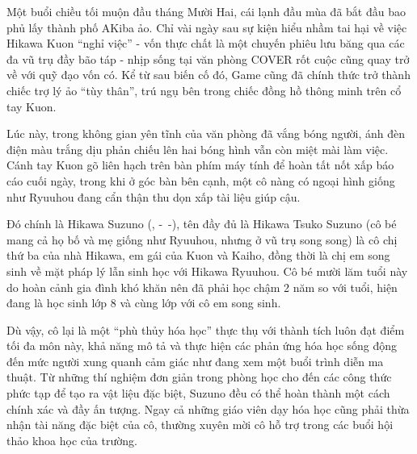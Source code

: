 \documentclass[../main.tex]{subfiles}
\begin{document}

Một buổi chiều tối muộn đầu tháng Mười Hai, cái lạnh đầu mùa đã bắt đầu bao phủ lấy thành phố AKiba ảo. Chỉ vài ngày sau sự kiện hiểu nhầm tai hại về việc Hikawa Kuon ``nghỉ việc'' - vốn thực chất là một chuyến phiêu lưu băng qua các đa vũ trụ đầy bão táp - nhịp sống tại văn phòng COVER rốt cuộc cũng quay trở về với quỹ đạo vốn có. Kể từ sau biến cố đó, Game cũng đã chính thức trở thành chiếc trợ lý ảo ``tùy thân'', trú ngụ bên trong chiếc đồng hồ thông minh trên cổ tay Kuon.

Lúc này, trong không gian yên tĩnh của văn phòng đã vắng bóng người, ánh đèn điện màu trắng dịu phản chiếu lên hai bóng hình vẫn còn miệt mài làm việc. Cánh tay Kuon gõ liên hạch trên bàn phím máy tính để hoàn tất nốt xấp báo cáo cuối ngày, trong khi ở góc bàn bên cạnh, một cô nàng có ngoại hình giống như Ryuuhou đang cẩn thận thu dọn xấp tài liệu giúp cậu.

\chrint

Đó chính là Hikawa Suzuno (, -\ -), tên đầy đủ là Hikawa Tsuko Suzuno (cô bé mang cả họ bố và mẹ giống như Ryuuhou, nhưng ở vũ trụ song song) là cô chị thứ ba của nhà Hikawa, em gái của Kuon và Kaiho, đồng thời là chị em song sinh về mặt pháp lý lẫn sinh học với Hikawa Ryuuhou. Cô bé mười lăm tuổi này do hoàn cảnh gia đình khó khăn nên đã phải học chậm 2 năm so với tuổi, hiện đang là học sinh lớp 8 và cùng lớp với cô em song sinh.

Dù vậy, cô lại là một ``phù thủy hóa học'' thực thụ với thành tích luôn đạt điểm tối đa môn này, khả năng mô tả và thực hiện các phản ứng hóa học sống động đến mức người xung quanh cảm giác như đang xem một buổi trình diễn ma thuật. Từ những thí nghiệm đơn giản trong phòng học cho đến các công thức phức tạp để tạo ra vật liệu đặc biệt, Suzuno đều có thể hoàn thành một cách chính xác và đầy ấn tượng. Ngay cả những giáo viên dạy hóa học cũng phải thừa nhận tài năng đặc biệt của cô, thường xuyên mời cô hỗ trợ trong các buổi hội thảo khoa học của trường.
\end{document}
